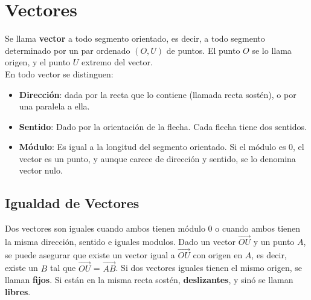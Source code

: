 \documentclass[11pt,a4paper]{article}
\begin{document}
\section{Vectores}
\noindent Se llama \textbf{vector} a todo segmento orientado, es decir, a todo segmento determinado por un par ordenado $(O,U)$ de puntos. El punto $O$ se lo llama origen, y el punto $U$ extremo del vector.\\
En todo vector se distinguen:
\begin{itemize}
\item \textbf{Direcci\'on}: dada por la recta que lo contiene (llamada recta sost\'en), o por una paralela a ella.
\item \textbf{Sentido}: Dado por la orientaci\'on de la flecha. Cada flecha tiene dos sentidos.
\item \textbf{M\'odulo}: Es igual a la longitud del segmento orientado. Si el m\'odulo es 0, el vector es un punto, y aunque carece de direcci\'on y sentido, se lo denomina vector nulo.
\end{itemize}
\subsection{Igualdad de Vectores}
\noindent Dos vectores son iguales cuando ambos tienen m\'odulo 0 o cuando ambos tienen la misma direcci\'on, sentido e iguales modulos. Dado un vector $\overrightarrow{OU}$ y un punto $A$, se puede asegurar que existe un vector igual a $\overrightarrow{OU}$ con origen en $A$, es decir, existe un $B$ tal que $\overrightarrow{OU}$ = $\overrightarrow{AB}$. Si dos vectores iguales tienen el mismo origen, se llaman \textbf{fijos}. Si est\'an en la misma recta sost\'en, \textbf{deslizantes}, y sin\'o se llaman \textbf{libres}.

\newpage
\end{document}
